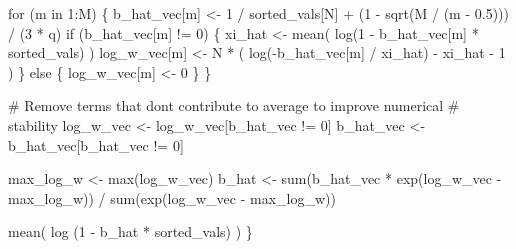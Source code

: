 \documentclass[
  letterpaper,
  DIV=11,
  numbers=noendperiod]{scrartcl}
\newenvironment{Shaded}{\begin{snugshade}}{\end{snugshade}}
\newcommand{\BuiltInTok}[1]{\textcolor[rgb]{0.00,0.23,0.31}{#1}}
\newcommand{\CommentTok}[1]{\textcolor[rgb]{0.37,0.37,0.37}{#1}}
\newcommand{\ControlFlowTok}[1]{\textcolor[rgb]{0.00,0.23,0.31}{#1}}
\newcommand{\DecValTok}[1]{\textcolor[rgb]{0.68,0.00,0.00}{#1}}
\newcommand{\FloatTok}[1]{\textcolor[rgb]{0.68,0.00,0.00}{#1}}
\newcommand{\KeywordTok}[1]{\textcolor[rgb]{0.00,0.23,0.31}{#1}}
\newcommand{\NormalTok}[1]{\textcolor[rgb]{0.00,0.23,0.31}{#1}}
\newcommand{\OperatorTok}[1]{\textcolor[rgb]{0.37,0.37,0.37}{#1}}
\begin{document}
\begin{Shaded}
\begin{Highlighting}[]
  \ControlFlowTok{for}\NormalTok{ (m }\KeywordTok{in} \DecValTok{1}\NormalTok{:M) \{}
\NormalTok{    b\_hat\_vec[m] }\OperatorTok{\textless{}{-}} \DecValTok{1} \OperatorTok{/}\NormalTok{ sorted\_vals[N] }\OperatorTok{+}
\NormalTok{                 (}\DecValTok{1} \OperatorTok{{-}}\NormalTok{ sqrt(M }\OperatorTok{/}\NormalTok{ (m }\OperatorTok{{-}} \FloatTok{0.5}\NormalTok{))) }\OperatorTok{/}\NormalTok{ (}\DecValTok{3} \OperatorTok{*}\NormalTok{ q)}
    \ControlFlowTok{if}\NormalTok{ (b\_hat\_vec[m] }\OperatorTok{!=} \DecValTok{0}\NormalTok{) \{}
\NormalTok{      xi\_hat }\OperatorTok{\textless{}{-}}\NormalTok{ mean( log(}\DecValTok{1} \OperatorTok{{-}}\NormalTok{ b\_hat\_vec[m] }\OperatorTok{*}\NormalTok{ sorted\_vals) )}
\NormalTok{      log\_w\_vec[m] }\OperatorTok{\textless{}{-}}\NormalTok{ N }\OperatorTok{*}\NormalTok{ ( log(}\OperatorTok{{-}}\NormalTok{b\_hat\_vec[m] }\OperatorTok{/}\NormalTok{ xi\_hat) }\OperatorTok{{-}}\NormalTok{ xi\_hat }\OperatorTok{{-}} \DecValTok{1}\NormalTok{ )}
\NormalTok{    \} }\ControlFlowTok{else}\NormalTok{ \{}
\NormalTok{      log\_w\_vec[m] }\OperatorTok{\textless{}{-}} \DecValTok{0}
\NormalTok{    \}}
\NormalTok{  \}}
  
  \CommentTok{\# Remove terms that don\textquotesingle{}t contribute to average to improve numerical }
  \CommentTok{\# stability}
\NormalTok{  log\_w\_vec }\OperatorTok{\textless{}{-}}\NormalTok{ log\_w\_vec[b\_hat\_vec }\OperatorTok{!=} \DecValTok{0}\NormalTok{]}
\NormalTok{  b\_hat\_vec }\OperatorTok{\textless{}{-}}\NormalTok{ b\_hat\_vec[b\_hat\_vec }\OperatorTok{!=} \DecValTok{0}\NormalTok{]}

\NormalTok{  max\_log\_w }\OperatorTok{\textless{}{-}} \BuiltInTok{max}\NormalTok{(log\_w\_vec)}
\NormalTok{  b\_hat }\OperatorTok{\textless{}{-}} \BuiltInTok{sum}\NormalTok{(b\_hat\_vec }\OperatorTok{*}\NormalTok{ exp(log\_w\_vec }\OperatorTok{{-}}\NormalTok{ max\_log\_w)) }\OperatorTok{/}
           \BuiltInTok{sum}\NormalTok{(exp(log\_w\_vec }\OperatorTok{{-}}\NormalTok{ max\_log\_w))}

\NormalTok{  mean( log (}\DecValTok{1} \OperatorTok{{-}}\NormalTok{ b\_hat }\OperatorTok{*}\NormalTok{ sorted\_vals) )}
\NormalTok{\}}
\end{Highlighting}
\end{Shaded}
\end{document}
